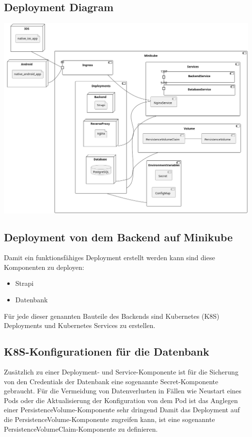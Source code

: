 \subsection{Deployment Diagram}
\begin{center}
  \includegraphics[width=\textwidth]{pics/dev-deployment.png}
\end{center}
\subsection{Deployment von dem Backend auf Minikube}

Damit ein funktionsfähiges Deployment erstellt werden kann sind diese Komponenten zu deployen:
\begin{itemize}
  \item Strapi
  \item Datenbank
\end{itemize}

Für jede dieser genannten Bauteile des Backends sind Kubernetes (K8S) Deployments und Kubernetes Services zu erstellen.

\subsection{K8S-Konfigurationen für die Datenbank}
Zusätzlich zu einer Deployment- und Service-Komponente ist für die Sicherung
von den Credentials der Datenbank eine sogenannte
Secret-Komponente gebraucht.
Für die Vermeidung von Datenverlusten in Fällen
wie Neustart eines Pods oder die Aktualisierung
der Konfiguration von dem Pod ist
das Anglegen einer PersistenceVolume-Komponente sehr dringend
Damit das Deployment auf die PersistenceVolume-Komponente zugreifen kann, ist eine sogenannte PersistenceVolumeClaim-Komponente zu definieren.

